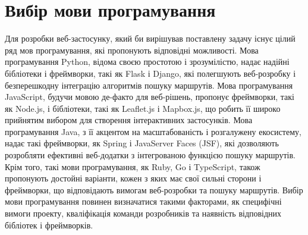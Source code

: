 \section{Вибір мови програмування}
\label{sec:programming-language}

Для розробки веб-застосунку, який би вирішував поставлену задачу існує цілий ряд мов програмування, які пропонують відповідні можливості. Мова програмування Python, відома своєю простотою і зрозумілістю, надає надійні бібліотеки і фреймворки, такі як Flask і Django, які полегшують веб-розробку і безперешкодну інтеграцію алгоритмів пошуку маршрутів. Мова програмування JavaScript, будучи мовою де-факто для веб-рішень, пропонує фреймворки, такі як Node.js, і бібліотеки, такі як Leaflet.js і Mapbox.js, що робить її широко прийнятим вибором для створення інтерактивних застосунків. Мова програмування Java, з її акцентом на масштабованість і розгалужену екосистему, надає такі фреймворки, як Spring і JavaServer Faces (JSF), які дозволяють розробляти ефективні веб-додатки з інтегрованою функцією пошуку маршрутів. Крім того, такі мови програмування, як Ruby, Go і TypeScript, також пропонують достойні варіанти, кожен з яких має свої сильні сторони і фреймворки, що відповідають вимогам веб-розробки та пошуку маршрутів. Вибір мови програмування повинен визначатися такими факторами, як специфічні вимоги проекту, кваліфікація команди розробників та наявність відповідних бібліотек і фреймворків.











